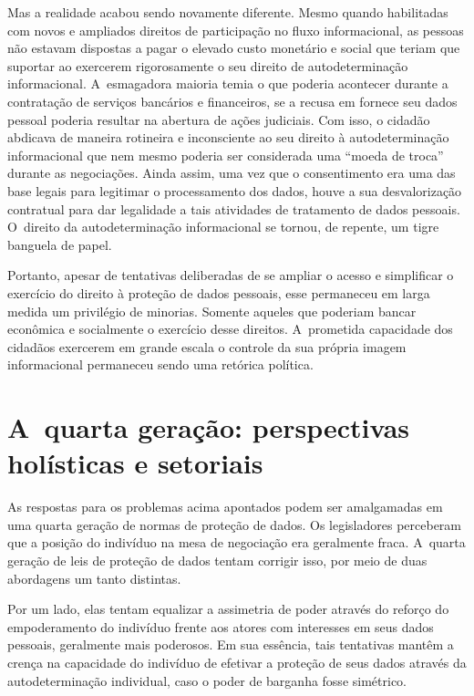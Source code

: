 Mas a realidade acabou sendo novamente diferente. Mesmo quando
habilitadas com novos e ampliados direitos de participação no fluxo
informacional, as pessoas não estavam dispostas a pagar o elevado custo
monetário e social que teriam que suportar ao exercerem rigorosamente o
seu direito de autodeterminação informacional. A~esmagadora maioria
temia o que poderia acontecer durante a contratação de serviços
bancários e financeiros, se a recusa em fornece seu dados pessoal
poderia resultar na abertura de ações judiciais. Com isso, o cidadão
abdicava de maneira rotineira e inconsciente ao seu direito à
autodeterminação informacional que nem mesmo poderia ser considerada uma
``moeda de troca'' durante as negociações. Ainda assim, uma vez que o
consentimento era uma das base legais para legitimar o processamento dos
dados, houve a sua desvalorização contratual para dar legalidade a tais
atividades de tratamento de dados pessoais. O~direito da
autodeterminação informacional se tornou, de repente, um tigre banguela
de papel.

Portanto, apesar de tentativas deliberadas de se ampliar o acesso e
simplificar o exercício do direito à proteção de dados pessoais, esse
permaneceu em larga medida um privilégio de minorias. Somente aqueles
que poderiam bancar econômica e socialmente o exercício desse direitos.
A~prometida capacidade dos cidadãos exercerem em grande escala o
controle da sua própria imagem informacional permaneceu sendo uma
retórica política.

\section{A~quarta geração: perspectivas holísticas e setoriais}

As respostas para os problemas acima apontados podem ser amalgamadas em
uma quarta geração de normas de proteção de dados. Os legisladores
perceberam que a posição do indivíduo na mesa de negociação era
geralmente fraca. A~quarta geração de leis de proteção de dados tentam
corrigir isso, por meio de duas abordagens um tanto distintas.

Por um lado, elas tentam equalizar a assimetria de poder através do
reforço do empoderamento do indivíduo frente aos atores com interesses
em seus dados pessoais, geralmente mais poderosos. Em sua essência, tais
tentativas mantêm a crença na capacidade do indivíduo de efetivar a
proteção de seus dados através da autodeterminação individual, caso o
poder de barganha fosse simétrico.

